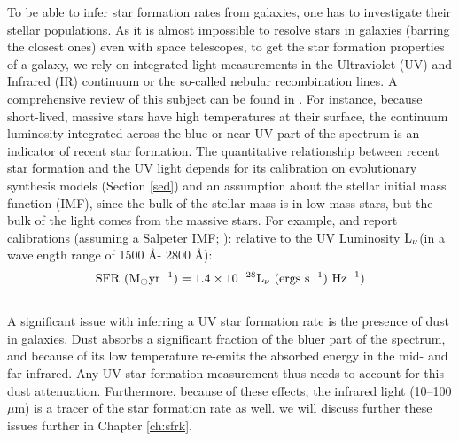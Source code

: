 To be able to infer star formation rates from galaxies, one has to
investigate their stellar populations. As it is almost impossible to
resolve stars in galaxies (barring the closest ones) even with space
telescopes, to get the star formation properties of a galaxy, we rely
on integrated light measurements in the Ultraviolet (UV) and Infrared
(IR) continuum or the so-called nebular recombination lines. A
comprehensive review of this subject can be found in
\citet{kennicutt_star_2012}. For instance, because short-lived,
massive stars have high temperatures at their surface, the continuum
luminosity integrated across the blue or near-UV part of the spectrum
is an indicator of recent star formation.  The quantitative
relationship between recent star formation and the UV light depends
for its calibration on evolutionary synthesis models (Section
\ref{sed}) and an assumption about the stellar initial mass function
(IMF), since the bulk of the stellar mass is in low mass stars, but
the bulk of the light comes from the massive stars. For example,
\citet{1998ApJ...498..106M} and \citet{kennicutt_star_2012} report
calibrations (assuming a Salpeter IMF; \citealt{1955ApJ...121..161S}):
relative to the UV Luminosity ${\rm L}_{\nu}$(in a wavelength range of
1500 \AA - 2800 \AA):
$${\rm SFR}\hbox{ }({\rm M}_{\odot} {\rm yr}^{-1}) = 1.4 \times 10^{-28} {\rm L}_{\rm \nu} \hbox{ }({\rm ergs }\hbox{ } {\rm s}^{-1})\hbox{ } {\rm Hz}^{-1})$$\\

A significant issue with inferring a UV star formation rate is the
presence of dust in galaxies. Dust absorbs a significant fraction of
the bluer part of the spectrum, and because of its low temperature
re-emits the absorbed energy in the mid- and far-infrared. Any UV star
formation measurement thus needs to account for this dust
attenuation. Furthermore, because of these effects, the infrared light
(10--100 $\mu$m) is a tracer of the star formation rate as well.  we
will discuss further these issues further in Chapter \ref{ch:sfrk}.

